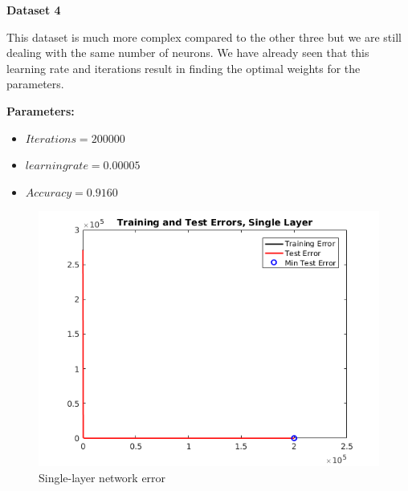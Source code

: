 \documentclass[a4paper,12pt]{article}
\begin{document}
\noindent \textbf{Dataset 4}

This dataset is much more complex compared to the other three but we are still dealing with the same number of neurons. We have already seen that this learning rate and iterations result in finding the optimal weights for the parameters.

\textbf{Parameters:}
\begin{itemize}
\item $Iterations = 200000$
\item $learning rate = 0.00005$
\item $Accuracy = 0.9160$
\end{itemize}

\begin{figure}[H]
\centering
  \begin{minipage}[]{1\textwidth}
  \caption{Single-layer network error}\label{fig:single_4_error}
  \includegraphics[width=\textwidth]{figures/single_4_error.png}
  \end{minipage}
\end{figure}
\end{document}
